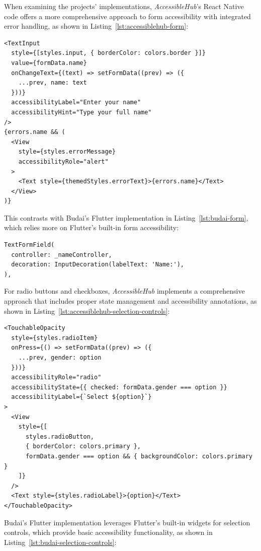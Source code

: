 When examining the projects' implementations, \textit{AccessibleHub}'s React Native code offers a more comprehensive approach to form accessibility with integrated error handling, as shown in Listing~\ref{lst:accessiblehub-form}:

\begin{lstlisting}[style=ReactNativeStyle, caption=Form implementation in AccessibleHub's React Native code, label=lst:accessiblehub-form]
<TextInput
  style={[styles.input, { borderColor: colors.border }]}
  value={formData.name}
  onChangeText={(text) => setFormData((prev) => ({
    ...prev, name: text
  }))}
  accessibilityLabel="Enter your name"
  accessibilityHint="Type your full name"
/>
{errors.name && (
  <View 
    style={styles.errorMessage} 
    accessibilityRole="alert"
  >
    <Text style={themedStyles.errorText}>{errors.name}</Text>
  </View>
)}
\end{lstlisting}

This contrasts with Budai's Flutter implementation in Listing~\ref{lst:budai-form}, which relies more on Flutter's built-in form accessibility:

\begin{lstlisting}[style=DartStyle, caption=Form implementation in Budai's Flutter code, label=lst:budai-form]
TextFormField(
  controller: _nameController,
  decoration: InputDecoration(labelText: 'Name:'),
),
\end{lstlisting}

\pagebreak

For radio buttons and checkboxes, \textit{AccessibleHub} implements a comprehensive approach that includes proper state management and accessibility annotations, as shown in Listing~\ref{lst:accessiblehub-selection-controls}:

\begin{lstlisting}[style=ReactNativeStyle, caption=Selection controls in AccessibleHub, label=lst:accessiblehub-selection-controls]
<TouchableOpacity
  style={styles.radioItem}
  onPress={() => setFormData((prev) => ({ 
    ...prev, gender: option 
  }))}
  accessibilityRole="radio"
  accessibilityState={{ checked: formData.gender === option }}
  accessibilityLabel={`Select ${option}`}
>
  <View
    style={[
      styles.radioButton,
      { borderColor: colors.primary },
      formData.gender === option && { backgroundColor: colors.primary }
    ]}
  />
  <Text style={styles.radioLabel}>{option}</Text>
</TouchableOpacity>
\end{lstlisting}

Budai's Flutter implementation leverages Flutter's built-in widgets for selection controls, which provide basic accessibility functionality, as shown in Listing~\ref{lst:budai-selection-controls}:

